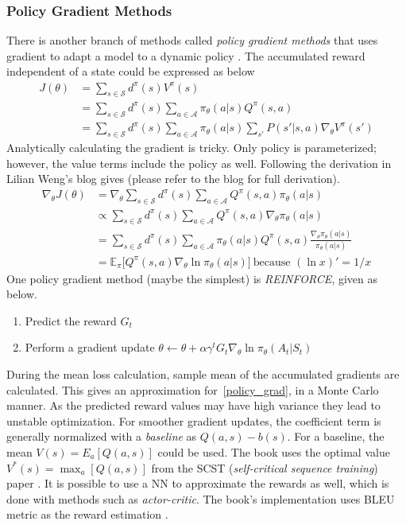 \documentclass{article}
\begin{document}
\subsubsection{Policy Gradient Methods}
There is another branch of methods called \textit{policy gradient methods} that uses gradient to adapt a model to a dynamic policy \cite{lapan_deep_2020}. The accumulated reward independent of a state could be expressed as below
\begin{align}
    J(\theta) 
&= \sum_{s \in \mathcal{S}} d^\pi(s) V^\pi(s) \\
&= \sum_{s \in \mathcal{S}} d^\pi(s) \sum_{a \in \mathcal{A}} \pi_\theta(a \vert s) Q^\pi(s, a)\\
&= \sum_{s \in \mathcal{S}} d^\pi(s)\sum_{a \in \mathcal{A}} \pi_\theta(a \vert s) \sum_{s'} P(s' \vert s,a) \nabla_\theta V^\pi(s')
\end{align}
Analytically calculating the gradient is tricky. Only policy is parameterized; however, the value terms include the policy as well. Following the derivation in Lilian Weng's blog gives (please refer to the blog for full derivation).
\begin{align}
\nabla_\theta J(\theta) 
&= \nabla_\theta \sum_{s \in \mathcal{S}} d^\pi(s) \sum_{a \in \mathcal{A}} Q^\pi(s, a) \pi_\theta(a \vert s) \\
&\propto \sum_{s \in \mathcal{S}} d^\pi(s) \sum_{a \in \mathcal{A}} Q^\pi(s, a) \nabla_\theta \pi_\theta(a \vert s) \\
&= \sum_{s \in \mathcal{S}} d^\pi(s) \sum_{a \in \mathcal{A}} \pi_\theta(a \vert s) Q^\pi(s, a) \frac{\nabla_\theta \pi_\theta(a \vert s)}{\pi_\theta(a \vert s)} \\
&= \mathbb{E}_\pi \big[Q^\pi(s, a) \nabla_\theta \ln \pi_\theta(a \vert s)\big]\ \scriptstyle{\text{because } (\ln x)' = 1/x} \label{policy_grad} 
\end{align}
One policy gradient method (maybe the simplest) is \textit{REINFORCE}, given as below.
\begin{enumerate}
    \item Predict the reward $G_t$
    \item Perform a gradient update $\theta \leftarrow \theta + \alpha \gamma^t G_t \nabla_\theta \ln \pi_\theta(A_t \vert S_t)$\ \cite{weng_policy_2018}
\end{enumerate}
During the mean loss calculation, sample mean of the accumulated gradients are calculated. This gives an approximation for~\ref{policy_grad}, in a Monte Carlo manner. As the predicted reward values may have high variance they lead to unstable optimization. For smoother gradient updates, the coefficient term is generally normalized with a \textit{baseline} as $Q(a,s)-b(s)$. For a baseline, the mean $V(s) = E_a[Q(a,s)]$ could be used. The book uses the optimal value $V^*(s) = \max_a[Q(a,s)]$ from the SCST (\textit{self-critical sequence training}) paper \cite{lapan_deep_2020, rennie_self-critical_2017}. It is possible to use a NN to approximate the rewards as well, which is done with methods such as \textit{actor-critic}. The book's implementation uses BLEU metric as the reward estimation \cite{lapan_deep_2020}. 
\end{document}

